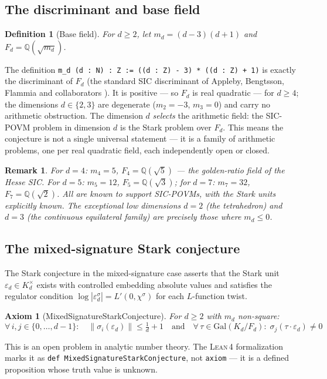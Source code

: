 \documentclass[12pt,a4paper]{article}
\newtheorem{definition}[theorem]{Definition}
\newtheorem{axiom_env}[theorem]{Axiom}
\newtheorem{remark}[theorem]{Remark}
\newcommand{\Lean}{\textsc{Lean\,4}}
\begin{document}
\subsection{The discriminant and base field}
\begin{definition}[Base field]
For $d \geq 2$, let $m_d = (d-3)(d+1)$ and $F_d = \mathbb{Q}(\sqrt{m_d})$.
\end{definition}
The definition \texttt{m\_d (d : N) : Z := ((d : Z) - 3) * ((d : Z) + 1)} is
exactly the discriminant of $F_d$ (the standard SIC discriminant of Appleby,
Bengtsson, Flammia and collaborators \cite{Appleby2013,Appleby2017}). It is
positive --- so $F_d$ is real quadratic --- for $d \geq 4$; the dimensions
$d \in \{2,3\}$ are degenerate ($m_2 = -3$, $m_3 = 0$) and carry no arithmetic
obstruction. The dimension $d$ \emph{selects} the
arithmetic field: the SIC-POVM problem in dimension $d$ is the Stark problem
over $F_d$. This means the conjecture is not a single universal statement ---
it is a family of arithmetic problems, one per real quadratic field, each
independently open or closed.
\begin{remark}
For $d=4$: $m_4 = 5$, $F_4 = \mathbb{Q}(\sqrt{5})$ --- the golden-ratio field
of the Hesse SIC. For $d=5$: $m_5 = 12$, $F_5 = \mathbb{Q}(\sqrt{3})$; for
$d=7$: $m_7 = 32$, $F_7 = \mathbb{Q}(\sqrt{2})$. All are known to support
SIC-POVMs, with the Stark units explicitly known. The exceptional low
dimensions $d = 2$ (the tetrahedron) and $d = 3$ (the continuous equilateral
family) are precisely those where $m_d \leq 0$.
\end{remark}
\subsection{The mixed-signature Stark conjecture}
The Stark conjecture in the mixed-signature case asserts that the Stark unit
$\varepsilon_d \in K_d^\times$ exists with controlled embedding absolute values
and satisfies the regulator condition $\log|\varepsilon_d^\sigma| = L'(0,\chi^\sigma)$
for each $L$-function twist.
\begin{axiom_env}[MixedSignatureStarkConjecture]
\label{ax:stark}
For $d \geq 2$ with $m_d$ non-square:
\[
\forall\, i,j \in \{0,\ldots,d-1\}:\quad
\|\sigma_i(\varepsilon_d)\| \leq \tfrac{1}{d} + 1
\quad\text{and}\quad
\forall\, \tau \in \mathrm{Gal}(K_d/F_d):\; \sigma_j(\tau\cdot\varepsilon_d) \neq 0
\]
\end{axiom_env}
This is an open problem in analytic number theory. The \Lean{}
formalization marks it as \texttt{def MixedSignatureStarkConjecture}, not
\texttt{axiom} --- it is a defined proposition whose truth value is unknown.
\end{document}
